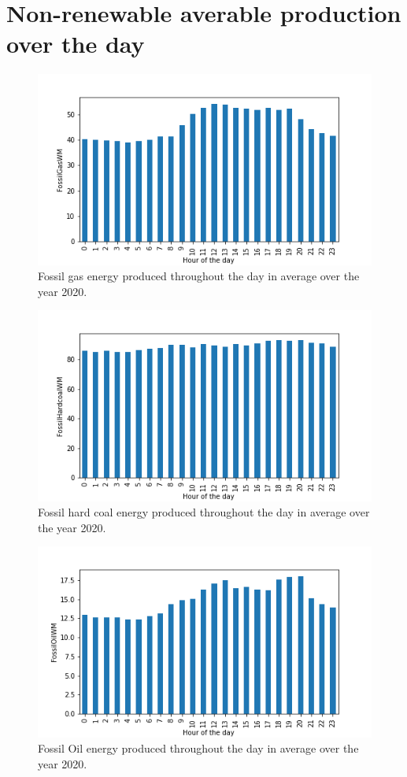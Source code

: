 \documentclass[11pt]{article} %
\begin{document}
\clearpage\newpage
\section{Non-renewable averable production over the day}\label{app:non_renewable}
\begin{figure}[h!]
  \includegraphics[width=0.8\linewidth]{../outputs/FossilGasWM.png}
  \caption{Fossil gas energy produced throughout the day in average over the year 2020.}
  \label{fig:gas_kwh}
\end{figure}
\begin{figure}[h!]
  \includegraphics[width=0.8\linewidth]{../outputs/FossilHardcoalWM.png}
  \caption{Fossil hard coal energy produced throughout the day in average over the year 2020.}
  \label{fig:coal_kwh}
\end{figure}
\begin{figure}[h!]
  \includegraphics[width=0.8\linewidth]{../outputs/FossilOilWM.png}
  \caption{Fossil Oil energy produced throughout the day in average over the year 2020.}
  \label{fig:oil_kwh}
\end{figure}
\end{document}
